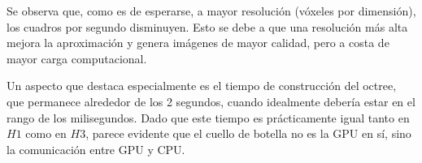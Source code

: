 Se observa que, como es de esperarse, a mayor resolución (vóxeles por dimensión), los cuadros por segundo disminuyen.
Esto se debe a que una resolución más alta mejora la aproximación y genera imágenes de mayor calidad, pero a costa de mayor carga computacional.

Un aspecto que destaca especialmente es el tiempo de construcción del octree, que permanece alrededor de los 2 segundos, cuando idealmente debería estar en el rango de los milisegundos.
Dado que este tiempo es prácticamente igual tanto en $H1$ como en $H3$, parece evidente que el cuello de botella no es la GPU en sí, sino la comunicación entre GPU y CPU.
